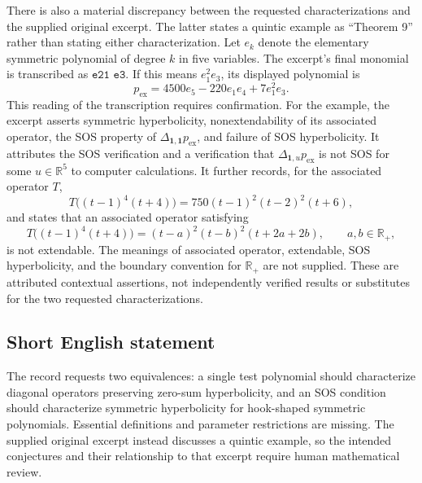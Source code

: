 \documentclass[11pt]{article}
\newcommand{\R}{\mathbb{R}}
\begin{document}
There is also a material discrepancy between the requested characterizations and the supplied original excerpt. The latter states a quintic example as ``Theorem 9'' rather than stating either characterization. Let \(e_k\) denote the elementary symmetric polynomial of degree \(k\) in five variables. The excerpt's final monomial is transcribed as \(\texttt{e21 e3}\). If this means \(e_1^2e_3\), its displayed polynomial is
\[
p_{\mathrm{ex}}=4500e_5-220e_1e_4+7e_1^2e_3.
\]
This reading of the transcription requires confirmation. For the example, the excerpt asserts symmetric hyperbolicity, nonextendability of its associated operator, the SOS property of \(\Delta_{\mathbf 1,\mathbf 1}p_{\mathrm{ex}}\), and failure of SOS hyperbolicity. It attributes the SOS verification and a verification that \(\Delta_{\mathbf 1,u}p_{\mathrm{ex}}\) is not SOS for some \(u\in\R^5\) to computer calculations. It further records, for the associated operator \(T\),
\[
T\bigl((t-1)^4(t+4)\bigr)=750(t-1)^2(t-2)^2(t+6),
\]
and states that an associated operator satisfying
\[
T\bigl((t-1)^4(t+4)\bigr)=(t-a)^2(t-b)^2(t+2a+2b),
\qquad a,b\in\R_+,
\]
is not extendable. The meanings of associated operator, extendable, SOS hyperbolicity, and the boundary convention for \(\R_+\) are not supplied. These are attributed contextual assertions, not independently verified results or substitutes for the two requested characterizations.
\subsection{Short English statement}
The record requests two equivalences: a single test polynomial should characterize diagonal operators preserving zero-sum hyperbolicity, and an SOS condition should characterize symmetric hyperbolicity for hook-shaped symmetric polynomials. Essential definitions and parameter restrictions are missing. The supplied original excerpt instead discusses a quintic example, so the intended conjectures and their relationship to that excerpt require human mathematical review.
\end{document}
